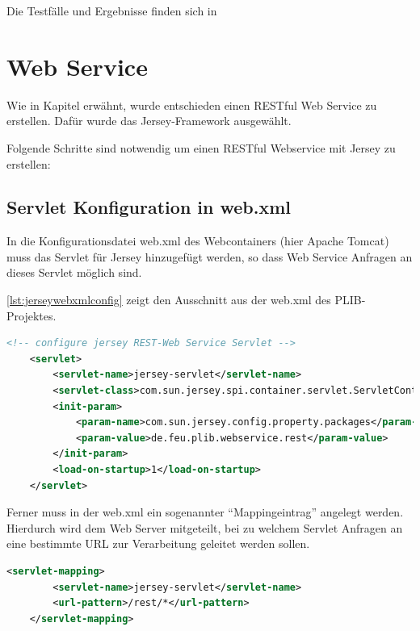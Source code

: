 Die Testfälle und Ergebnisse finden sich in 

\section{Web Service}\label{kap:webservice}

Wie in Kapitel  erwähnt, wurde entschieden einen \gls{REST}ful Web Service zu erstellen. Dafür wurde das Jersey-Framework ausgewählt.

Folgende Schritte sind notwendig um einen \gls{REST}ful Webservice mit Jersey zu erstellen: 

\subsection{Servlet Konfiguration in web.xml} 

In die Konfigurationsdatei web.xml des Webcontainers (hier \gls{Apache Tomcat}) muss das Servlet für \gls{Jersey} hinzugefügt werden, so dass \gls{Web Service} Anfragen an dieses Servlet möglich sind. 

\autoref{lst:jerseywebxmlconfig} zeigt den Ausschnitt aus der web.xml des \gls{PLIB}-Projektes. 

 \begin{lstlisting}[caption=Jersey Servlet Konfiguration in web.xml, language=XML, label=lst:jerseywebxmlconfig]
 <!-- configure jersey REST-Web Service Servlet -->
    <servlet>
        <servlet-name>jersey-servlet</servlet-name>
        <servlet-class>com.sun.jersey.spi.container.servlet.ServletContainer</servlet-class>
        <init-param>
            <param-name>com.sun.jersey.config.property.packages</param-name>
            <param-value>de.feu.plib.webservice.rest</param-value>
        </init-param>
        <load-on-startup>1</load-on-startup>
    </servlet>
 \end{lstlisting}   
 
Ferner muss in der web.xml ein sogenannter \enquote{Mappingeintrag} angelegt werden. Hierdurch wird dem Web Server mitgeteilt, bei zu welchem Servlet Anfragen an eine bestimmte URL zur Verarbeitung geleitet werden sollen. 
 
  \begin{lstlisting}[caption=Jersey Servlet Mappingkonfiguration in web.xml, language=XML, label=lst:jerseywebxmlconfigmapping]
    <servlet-mapping>
        <servlet-name>jersey-servlet</servlet-name>
        <url-pattern>/rest/*</url-pattern>
    </servlet-mapping>
 \end{lstlisting}  
 
